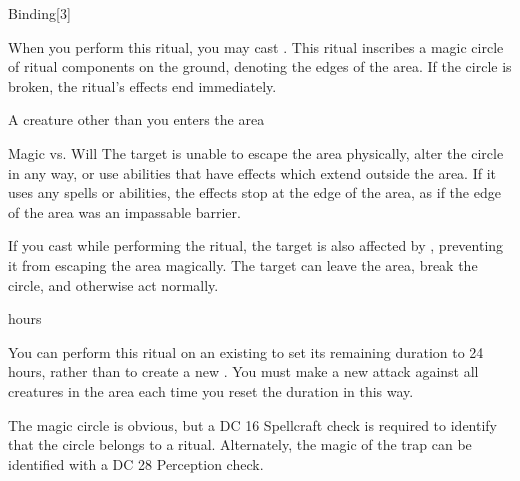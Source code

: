 \begin{spellsection}{Binding}[3]
    \begin{spellheader}
    \end{spellheader}
    \begin{spellcontent}
        \begin{spelltargetinginfo}
        \end{spelltargetinginfo}
        \begin{spelleffects}

            \spellspecial When you perform this ritual, you may cast .
            \spellline
            \spelleffect This ritual inscribes a magic circle of ritual components on the ground, denoting the edges of the area. If the circle is broken, the ritual's effects end immediately.
            \begin{spelltrigger}{A creature other than you enters the area}
                \begin{spellattack}{Magic vs. Will}
                    \spellsuccess The target is unable to escape the area physically, alter the circle in any way, or use abilities that have effects which extend outside the area. If it uses any spells or abilities, the effects stop at the edge of the area, as if the edge of the area was an impassable barrier.

                    If you cast  while performing the ritual, the target is also affected by , preventing it from escaping the area magically.
                    \spellfailure The target can leave the area, break the circle, and otherwise act normally.
                \end{spellattack}
            \end{spelltrigger}

             hours
        \end{spelleffects}
    \end{spellcontent}
    \begin{spellfooter}
        \spellnotes You can perform this ritual on an existing  to set its remaining duration to 24 hours, rather than to create a new . You must make a new attack against all creatures in the area each time you reset the duration in this way.

        The magic circle is obvious, but a DC 16 Spellcraft check is required to identify that the circle belongs to a  ritual. Alternately, the magic of the trap can be identified with a DC 28 Perception check.
    \end{spellfooter}
\end{spellsection}

